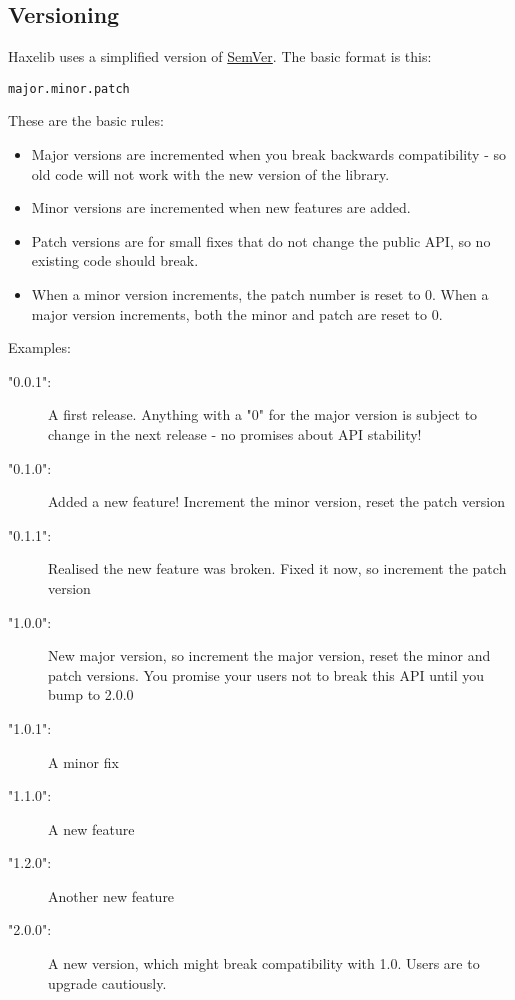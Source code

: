 \subsection{Versioning}
\label{haxelib-json-versioning}

Haxelib uses a simplified version of \href{http://semver.org/}{SemVer}. The basic format is this:

\begin{lstlisting}
major.minor.patch
\end{lstlisting}

These are the basic rules:

\begin{itemize}
	\item Major versions are incremented when you break backwards compatibility - so old code will not work with the new version of the library.
	\item Minor versions are incremented when new features are added.
	\item Patch versions are for small fixes that do not change the public API, so no existing code should break.
	\item When a minor version increments, the patch number is reset to 0. When a major version increments, both the minor and patch are reset to 0.
\end{itemize}

Examples:

\begin{description}
\item["0.0.1":] A first release.  Anything with a "0" for the major version is subject to change in the next release - no promises about API stability!
\item["0.1.0":] Added a new feature!   Increment the minor version, reset the patch version
\item["0.1.1":] Realised the new feature was broken.  Fixed it now, so increment the patch version
\item["1.0.0":] New major version, so increment the major version, reset the minor and patch versions.   You promise your users not to break this API until you bump to 2.0.0
\item["1.0.1":] A minor fix
\item["1.1.0":] A new feature
\item["1.2.0":] Another new feature
\item["2.0.0":] A new version, which might break compatibility with 1.0.  Users are to upgrade cautiously.
\end{description}

